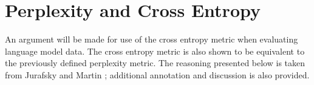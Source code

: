 \documentclass[10pt]{article}
\newcommand{\ngram}{$n$-gram\xspace}
\newcommand{\ngrams}{$n$-grams\xspace}
\begin{document}





\section{Perplexity and Cross Entropy} \label{appendixPerplexity}
An argument will be made for use of the cross entropy metric when evaluating language model data.
The cross entropy metric is also shown to be equivalent to the previously defined perplexity metric.
The reasoning presented below is taken from Jurafsky and Martin \cite{jurafsky2008speech}; additional annotation and discussion is also provided.
\end{document}

